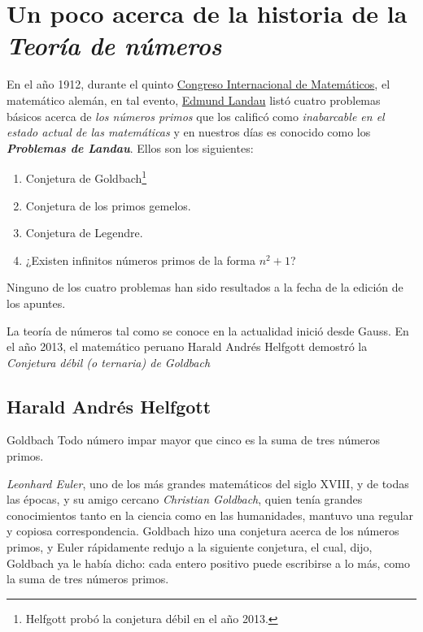 \chapter*{Un poco acerca de la historia de la \emph{Teoría de números}}

En el año 1912, durante el quinto 
\href{https://www.mathunion.org/organization/imu-history}{Congreso Internacional de Matemáticos}, el matemático alemán, en tal evento, \href{https://en.wikipedia.org/wiki/Edmund_Landau}{Edmund Landau} listó cuatro problemas básicos acerca de \emph{los números primos} que los calificó como \emph{inabarcable en el estado actual de las matemáticas} y en nuestros días es conocido como los \textbf{\textit{Problemas de Landau}}. Ellos son los siguientes:
\begin{enumerate}
	\item Conjetura de Goldbach\footnote{Helfgott probó la conjetura débil en el año 2013.}
	\item Conjetura de los primos gemelos.
	\item Conjetura de Legendre.
	\item ¿Existen infinitos números primos de la forma $n^{2}+1$?
\end{enumerate}

Ninguno de los cuatro problemas han sido resultados a la fecha de la edición de los apuntes.

La teoría de números tal como se conoce en la actualidad inició desde Gauss. En el año 2013, el matemático peruano Harald Andrés Helfgott demostró la \emph{Conjetura débil (o ternaria) de Goldbach}
\section{Harald Andrés Helfgott}
\begin{conjecture}{Goldbach}
Todo número impar mayor que cinco es la suma de tres números primos.
\end{conjecture}
\emph{Leonhard Euler}, uno de los más grandes matemáticos del siglo XVIII, y de todas las épocas, y su amigo cercano \emph{Christian Goldbach}, quien tenía grandes conocimientos tanto en la ciencia como en las humanidades, mantuvo una regular y copiosa correspondencia. Goldbach hizo una conjetura acerca de los números primos, y Euler rápidamente redujo a la siguiente conjetura, el cual, dijo, Goldbach ya le había dicho: cada entero positivo puede escribirse a lo más, como la suma de tres números primos.

